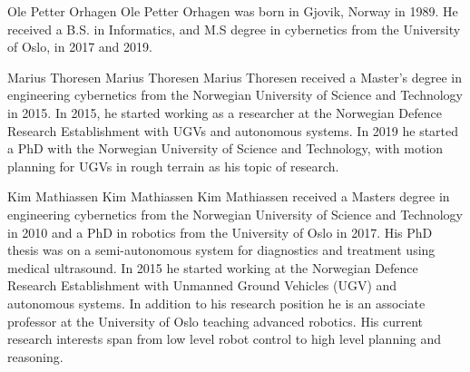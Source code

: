 \documentclass{IEEEtran}
\newcommand{\0}{\mathbf{0}}
\newcommand{\1}{\mathbf{1}}
\begin{document}





\begin{IEEEbiographynophoto}{Ole Petter Orhagen}
  Ole Petter Orhagen was born in Gjovik, Norway in 1989. He received a B.S. in
  Informatics, and M.S degree in cybernetics from the University of Oslo, in
  2017 and 2019.
\end{IEEEbiographynophoto}

\begin{IEEEbiographynophoto}{Marius Thoresen}
  Marius Thoresen Marius Thoresen received a Master’s degree in engineering
  cybernetics from the Norwegian University of Science and Technology in 2015.
  In 2015, he started working as a researcher at the Norwegian Defence Research
  Establishment with UGVs and autonomous systems. In 2019 he started a PhD with
  the Norwegian University of Science and Technology, with motion planning for
  UGVs in rough terrain as his topic of research.
\end{IEEEbiographynophoto}

\begin{IEEEbiographynophoto}{Kim Mathiassen}
  Kim Mathiassen Kim Mathiassen received a
  Masters degree in engineering cybernetics from
  the Norwegian University of Science and Technology in 2010 and a PhD in robotics from the
  University of Oslo in 2017. His PhD thesis was
  on a semi-autonomous system for diagnostics
  and treatment using medical ultrasound.
  In 2015 he started working at the Norwegian Defence Research Establishment with
  Unmanned Ground Vehicles (UGV) and autonomous systems. In addition to his research
  position he is an associate professor at the University of Oslo teaching
  advanced robotics. His current research interests span from low level
  robot control to high level planning and reasoning.
 \end{IEEEbiographynophoto}
\end{document}
